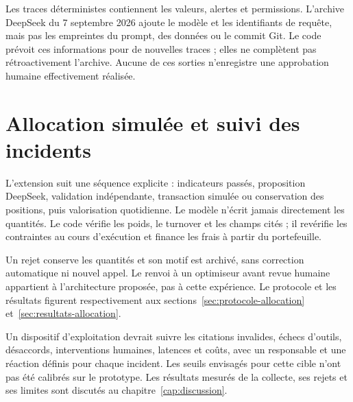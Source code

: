 Les traces déterministes contiennent les valeurs, alertes et permissions. L'archive DeepSeek du 7 septembre 2026 ajoute le modèle et les identifiants de requête, mais pas les empreintes du prompt, des données ou le commit Git. Le code prévoit ces informations pour de nouvelles traces ; elles ne complètent pas rétroactivement l'archive. Aucune de ces sorties n'enregistre une approbation humaine effectivement réalisée.

\section{Allocation simulée et suivi des incidents}

L'extension suit une séquence explicite : indicateurs passés, proposition DeepSeek, validation indépendante, transaction simulée ou conservation des positions, puis valorisation quotidienne. Le modèle n'écrit jamais directement les quantités. Le code vérifie les poids, le turnover et les champs cités ; il revérifie les contraintes au cours d'exécution et finance les frais à partir du portefeuille.

Un rejet conserve les quantités et son motif est archivé, sans correction automatique ni nouvel appel. Le renvoi à un optimiseur avant revue humaine appartient à l'architecture proposée, pas à cette expérience. Le protocole et les résultats figurent respectivement aux sections~\ref{sec:protocole-allocation} et~\ref{sec:resultats-allocation}.

Un dispositif d'exploitation devrait suivre les citations invalides, échecs d'outils, désaccords, interventions humaines, latences et coûts, avec un responsable et une réaction définis pour chaque incident. Les seuils envisagés pour cette cible n'ont pas été calibrés sur le prototype. Les résultats mesurés de la collecte, ses rejets et ses limites sont discutés au chapitre~\ref{cap:discussion}.
